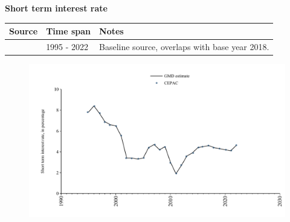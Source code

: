 \documentclass[12pt,a4paper,landscape]{article}
\begin{document}
\begin{adjustbox}{max totalsize={\paperwidth}{\paperheight},center}
\begin{minipage}[t][\textheight][t]{\textwidth}
\vspace*{0.5cm}
{}
\begin{center}
{\Large\bfseries Short term interest rate}
\end{center}
\vspace{0.5cm}
\begin{table}[H]
\centering
\small
\begin{tabular}{|l|l|l|}
\hline
\textbf{Source} & \textbf{Time span} & \textbf{Notes} \\
\hline
\rowcolor{white}\cite{CEPAC}& 1995 - 2022 &Baseline source, overlaps with base year 2018. \\
\hline
\end{tabular}
\end{table}
\begin{figure}[H]
\centering
\includegraphics[width=\textwidth,height=0.6\textheight,keepaspectratio]{graphs/SLV_strate.pdf}
\end{figure}
\end{minipage}
\end{adjustbox}
\end{document}
